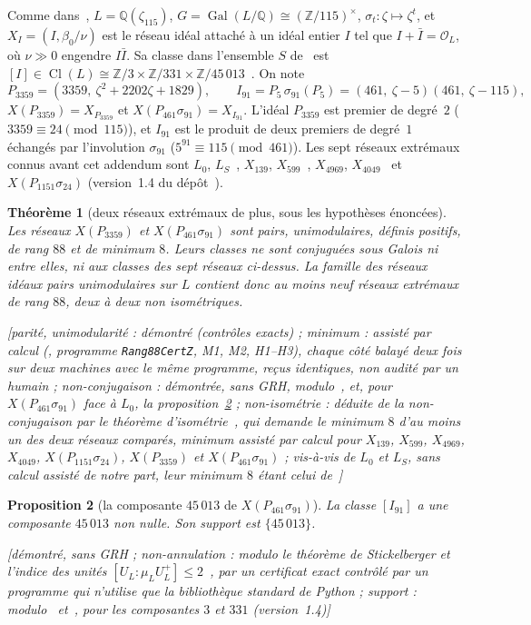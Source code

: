 \documentclass[11pt,a4paper]{amsart}
\theoremstyle{plain}
\newtheorem{theorem}{Théorème}[section]
\newtheorem{proposition}[theorem]{Proposition}
\theoremstyle{definition}
\newcommand{\Q}{\mathbb{Q}}
\newcommand{\Z}{\mathbb{Z}}
\newcommand{\OO}{\mathcal{O}}
\DeclareMathOperator{\Cl}{Cl}
\DeclareMathOperator{\Gal}{Gal}
\newcommand{\Lz}{L_{0}}
\newcommand{\LS}{L_{S}}
\newcommand{\XA}{X(P_{3359})}
\newcommand{\XB}{X(P_{461}\sigma_{91})}
\newcommand{\XC}{X(P_{1151}\sigma_{24})}
\newcommand{\st}[1]{\textup{\textsf{\small[#1]}}}
\begin{document}
Comme dans~\cite{Gau26}, $L=\Q(\zeta_{115})$, $G=\Gal(L/\Q)\cong(\Z/115)^\times$, $\sigma_t\colon\zeta\mapsto\zeta^t$, et $X_I=(I,\beta_0/\nu)$ est le réseau idéal attaché à un idéal entier $I$ tel que $I+\bar I=\OO_L$, où $\nu\gg0$ engendre $I\bar I$. Sa classe dans l'ensemble $S$ de~\cite{Gau26} est $[I]\in\Cl(L)\cong\Z/3\times\Z/331\times\Z/45\,013$~\cite[prop.~2.2, 2.3]{Gau26}. On note
\[
P_{3359}=(3359,\ \zeta^2+2202\zeta+1829),\qquad I_{91}=P_5\,\sigma_{91}(P_5)=(461,\ \zeta-5)(461,\ \zeta-115),
\]
$\XA=X_{P_{3359}}$ et $\XB=X_{I_{91}}$. L'idéal $P_{3359}$ est premier de degré~$2$ ($3359\equiv24\pmod{115}$), et $I_{91}$ est le produit de deux premiers de degré~$1$ échangés par l'involution $\sigma_{91}$ ($5^{91}\equiv115\pmod{461}$). Les sept réseaux extrémaux connus avant cet addendum sont $\Lz$, $\LS$~\cite{Sak26}, $X_{139}$, $X_{599}$~\cite{Gau26}, $X_{4969}$, $X_{4049}$~\cite{Gau26a} et $\XC$ (version~1.4 du dépôt~\cite{Gau26b}).

\begin{theorem}[deux réseaux extrémaux de plus, sous les hypothèses énoncées]\label{thm:neuf}
Les réseaux $\XA$ et $\XB$ sont pairs, unimodulaires, définis positifs, de rang $88$ et de minimum $8$. Leurs classes ne sont conjuguées sous Galois ni entre elles, ni aux classes des sept réseaux ci-dessus. La famille des réseaux idéaux pairs unimodulaires sur $L$ contient donc au moins neuf réseaux extrémaux de rang $88$, deux à deux non isométriques.

\st{parité, unimodularité : démontré (contrôles exacts) ; minimum : assisté par calcul (\cite[th.~4.6]{Gau26}, programme \texttt{Rang88CertZ}, M1, M2, H1--H3), chaque côté balayé deux fois sur deux machines avec le même programme, reçus identiques, non audité par un humain ; non-conjugaison : démontrée, sans GRH, modulo~\cite[prop.~2.2, 2.5]{Gau26}, \cite[prop.~4.7]{Gau26a} et, pour $\XB$ face à $\Lz$, la proposition~\ref{prop:45013} ; non-isométrie : déduite de la non-conjugaison par le théorème d'isométrie~\cite[th.~3.3]{Gau26}, qui demande le minimum $8$ d'au moins un des deux réseaux comparés, minimum assisté par calcul pour $X_{139}$, $X_{599}$, $X_{4969}$, $X_{4049}$, $\XC$, $\XA$ et $\XB$ ; vis-à-vis de $\Lz$ et $\LS$, sans calcul assisté de notre part, leur minimum $8$ étant celui de~\cite{Sak26}}
\end{theorem}

\begin{proposition}[la composante $45\,013$ de $\XB$]\label{prop:45013}
La classe $[I_{91}]$ a une composante $45\,013$ non nulle. Son support est $\{45\,013\}$.

\st{démontré, sans GRH ; non-annulation : modulo le théorème de Stickelberger et l'indice des unités $[U_L:\mu_LU_L^+]\le2$~\cite[th.~6.10, 4.12]{Was97}, par un certificat exact contrôlé par un programme qui n'utilise que la bibliothèque standard de Python ; support : modulo~\cite[prop.~2.2, 2.5]{Gau26} et~\cite[prop.~4.7]{Gau26a}, pour les composantes $3$ et $331$ (version~1.4)}
\end{proposition}
\end{document}
